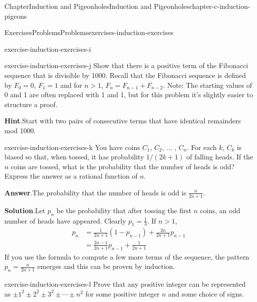 \documentclass[oneside,10pt,]{book}
\newcommand{\blocktitlefont}{\relax}
\numberwithin{equation}{section}
\newcommand{\gt}{>}
\begin{document}
\begin{chapterptx}{Chapter}{Induction and Pigeonholes}{}{Induction and Pigeonholes}{}{}{chapter-c-induction-pigeons}
\begin{exercises-section}{Exercises}{Problems}{}{Problems}{}{}{exercises-induction-exercises}
\begin{divisionexercise}{8}{}{}{exercise-induction-exercises-i}
\end{divisionexercise}%
\begin{divisionexercise}{9}{}{}{exercise-induction-exercises-j}%
Show that there is a positive term of the Fibonacci sequence that is divisible by 1000. Recall that the Fibonacci sequence is defined by \(F_0=0\), \(F_1= 1\) and for \(n>1\), \(F_n= F_{n-1}+F_{n-2}\). Note: The starting values of 0 and 1 are often replaced with 1 and 1, but for this problem it's slightly easier to structure a proof.%
\par\smallskip%
\noindent\textbf{\blocktitlefont Hint}.\hypertarget{hint-induction-exercises-j-b}{}\quad{}Start with two pairs of consecutive terms that have identical remainders mod 1000.%
\end{divisionexercise}%
\begin{divisionexercise}{10}{}{}{exercise-induction-exercises-k}%
You have coins \(C_1\), \(C_2\), ... , \(C_n\). For each \(k\), \(C_k\) is biased so that, when tossed, it has probability \(1/(2k + 1)\) of falling heads. If the \(n\) coins are tossed, what is the probability that the number of heads is odd? Express the answer as a rational function of \(n\).%
\par\smallskip%
\noindent\textbf{\blocktitlefont Answer}.\hypertarget{answer-induction-exercises-k-b}{}\quad{}The probability that the number of heads is odd is \(\frac{n}{2n+1}.\)%
\par\smallskip%
\noindent\textbf{\blocktitlefont Solution}.\hypertarget{solution-induction-exercises-k-c}{}\quad{}Let \(p_n\) be the probability that after tossing the first \(n\) coins, an odd number of heads have appeared.  Clearly \(p_1 = \frac{1}{3}\).  If \(n \gt 1\),%
\begin{equation*}
\begin{split}
p_n &= \frac{1}{2n+1}  (1-p_{n-1}) + \frac{2n}{2n+1} p_{n-1}\\
& = \frac{2n-1}{2n+1}p_{n-1} + \frac{1}{2n+1}
\end{split}
\end{equation*}
If you use the formula to compute a few more terms of the sequence, the pattern \(p_n=\frac{n}{2n+1} \) emerges and this can be proven by induction.%
\end{divisionexercise}%
\begin{divisionexercise}{11}{}{}{exercise-induction-exercises-l}%
Prove that any positive integer can be represented as \(\pm 1^2\pm 2^2\pm 3^2\pm \cdots \pm n^2\) for some positive integer \(n\) and some choice of signs.%
\end{divisionexercise}%

\end{exercises-section}
\end{chapterptx}
\end{document}
